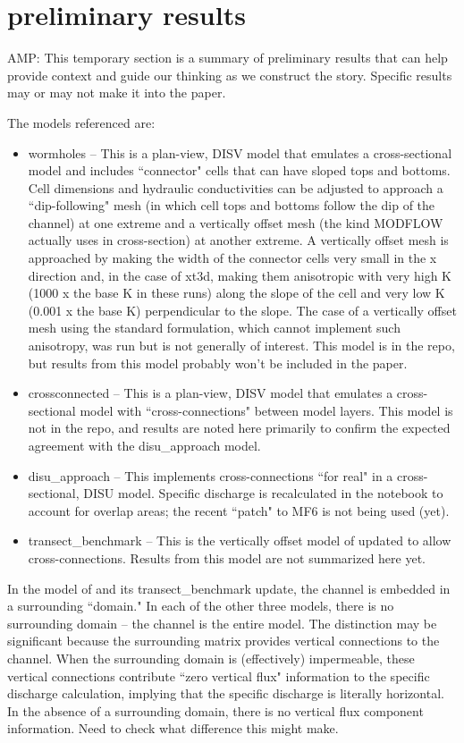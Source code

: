 \documentclass{article}
\begin{document}
\section{preliminary results}
{\color{red} AMP: This temporary section is a summary of preliminary results that can help provide context and guide our thinking as we construct the story.  Specific results may or may not make it into the paper.}

The models referenced are:
\begin{itemize}
	\item wormholes -- This is a plan-view, DISV model that emulates a cross-sectional model and includes ``connector" cells that can have sloped tops and bottoms. Cell dimensions and hydraulic conductivities can be adjusted to approach a ``dip-following" mesh (in which cell tops and bottoms follow the dip of the channel) at one extreme and a vertically offset mesh (the kind MODFLOW actually uses in cross-section) at another extreme. A vertically offset mesh is approached by making the width of the connector cells very small in the x direction and, in the case of xt3d, making them anisotropic with very high K (1000 x the base K in these runs) along the slope of the cell and very low K (0.001 x the base K) perpendicular to the slope. The case of a vertically offset mesh using the standard formulation, which cannot implement such anisotropy, was run but is not generally of interest. This model is in the repo, but results from this model probably won't be included in the paper.
	\item crossconnected -- This is a plan-view, DISV model that emulates a cross-sectional model with ``cross-connections" between model layers. This model is not in the repo, and results are noted here primarily to confirm the expected agreement with the disu\_approach model.
	\item disu\_approach -- This implements cross-connections ``for real" in a cross-sectional, DISU model. Specific discharge is recalculated in the notebook to account for overlap areas; the recent ``patch" to MF6 is not being used (yet).
	\item transect\_benchmark -- This is the vertically offset model of \cite{bardot2022} updated to allow cross-connections. Results from this model are not summarized here yet.
\end{itemize}

In the model of \cite{bardot2022} and its transect\_benchmark update, the channel is embedded in a surrounding ``domain."  In each of the other three models, there is no surrounding domain -- the channel is the entire model. The distinction may be significant because the surrounding matrix provides vertical connections to the channel. When the surrounding domain is (effectively) impermeable, these vertical connections contribute ``zero vertical flux" information to the specific discharge calculation, implying that the specific discharge is literally horizontal. In the absence of a surrounding domain, there is no vertical flux component information. Need to check what difference this might make.
\end{document}
